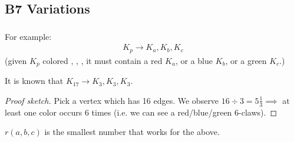\documentclass[12pt]{article}
\begin{document}
\subsection{B7 Variations}
\subsubsection{\bt{!} }

For example:\begin{align*}
    K_p\to K_a,K_b,K_c
\end{align*}
(given $K_p$ colored , , , it must contain a red $K_a$, or a blue $K_b$, or a green $K_c$.)

\eg It is known that $K_{17}\to K_3,K_3,K_3$.
\begin{proof}[Proof sketch]
    Pick a vertex which has 16 edges. We observe $16\div 3=5\frac{1}{3} \implies $ at least one color occurs 6 times (i.e. we can see a red/blue/green 6-claws).
\end{proof}

\rmk $r(a,b,c)$ is the smallest number that works for the above.
\end{document}
